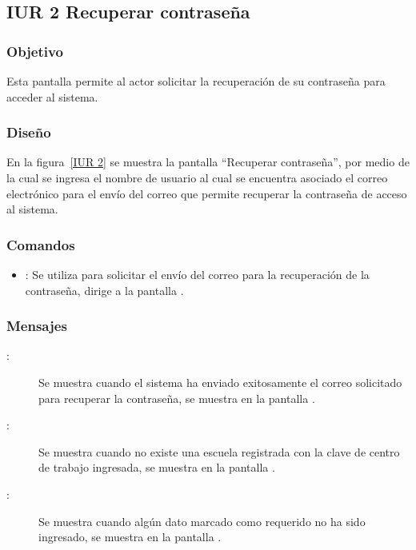 \subsection{IUR 2 Recuperar contraseña}

\subsubsection{Objetivo}

    Esta pantalla permite al actor  solicitar la recuperación de su contraseña para acceder al sistema.

\subsubsection{Diseño}

    En la figura~\ref{IUR 2} se muestra la pantalla ``Recuperar contraseña'', por medio de la cual se ingresa el nombre de usuario al cual se encuentra asociado el correo electrónico para el envío del correo que permite recuperar la contraseña de acceso al sistema. \\


\subsubsection{Comandos}
\begin{itemize}
    \item {}: Se utiliza para solicitar el envío del correo para la recuperación de la contraseña, dirige a la pantalla .
\end{itemize}

\subsubsection{Mensajes}

    \begin{description}
	\item[:] Se muestra cuando el sistema ha enviado exitosamente el correo solicitado para recuperar la contraseña, se muestra en la pantalla .
	\item[:] Se muestra cuando no existe una escuela registrada con la clave de centro de trabajo ingresada, se muestra en la pantalla .
	\item[:] Se muestra cuando algún dato marcado como requerido no ha sido ingresado, se muestra en la pantalla .

    \end{description}
 